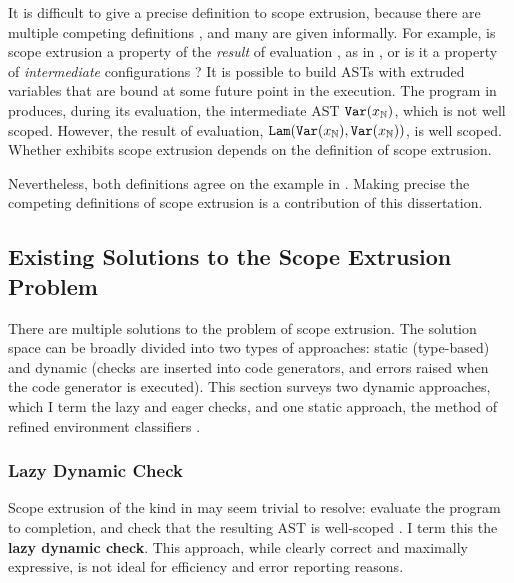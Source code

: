 It is difficult to give a precise definition to scope extrusion, because there are multiple competing definitions \citep{kiselyov-14,kiselyov-16}, and many are given informally. For example, is scope extrusion a property of the \textit{result} of evaluation \citep{kiselyov-16}, as in , or is it a property of \textit{intermediate} configurations \citep{kiselyov-14}? It is possible to build ASTs with extruded variables that are bound at some future point in the execution. The program in  produces, during its evaluation, the intermediate AST $\texttt{Var}(x_{\mathbb{N}})$, which is not well scoped. However, the result of evaluation, $\texttt{Lam}(\texttt{Var}(x_{\mathbb{N}}), \texttt{Var}(x_{\mathbb{N}}))$, is well scoped. Whether  exhibits scope extrusion depends on the definition of scope extrusion.

Nevertheless, both definitions agree on the example in . Making precise the competing definitions of scope extrusion is a contribution of this dissertation. 

\subsection{Existing Solutions to the Scope Extrusion Problem}
There are multiple solutions to the problem of scope extrusion. The solution space can be broadly divided into two types of approaches: static (type-based) and dynamic (checks are inserted into code generators, and errors raised when the code generator is executed). This section surveys two dynamic approaches, which I term the lazy and eager checks, and one static approach, the method of refined environment classifiers \citep{kiselyov-16,isoda-24}. 

\subsubsection{Lazy Dynamic Check}\label{subsubsection:lazy-dynamic-check}
Scope extrusion of the kind in  may seem trivial to resolve: evaluate the program to completion, and check that the resulting AST is well-scoped \citep{kiselyov-14}. I term this the \textbf{lazy dynamic check}. This approach, while clearly correct and maximally expressive, is not ideal for efficiency and error reporting reasons. 

